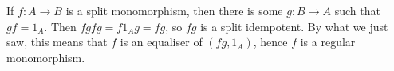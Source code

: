 If $f\colon A\to B$ is a split monomorphism, then there is some
$g\colon B\to A$ such that $gf = 1_A$. Then $fgfg = f1_Ag = fg$, so
$fg$ is a split idempotent. By what we just saw, this means that $f$
is an equaliser of $(fg, 1_A)$, hence $f$ is a regular monomorphism.
